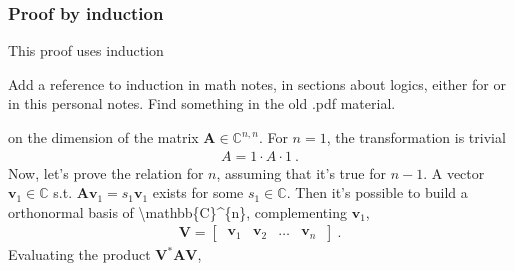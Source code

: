\documentclass[letterpaper,10pt,english]{jupyterBook}
\begin{document}
\subsubsection*{Proof by induction}

\sphinxAtStartPar
This proof uses induction%
\begin{footnote}[1]\sphinxAtStartFootnote
{} Add a reference to induction in math notes, in sections about logics, either for  or in this personal notes. Find something in the old .pdf material.
%
\end{footnote} on the dimension of the matrix \(\mathbf{A} \in \mathbb{C}^{n,n}\). For \(n = 1\), the transformation is trivial
\begin{equation*}
\begin{split}A = 1 \cdot A \cdot 1 \ .\end{split}
\end{equation*}
\sphinxAtStartPar
Now, let’s prove the relation for \(n\), assuming that it’s true for \(n-1\). A vector \(\mathbf{v}_1 \in \mathbb{C}\) s.t. \(\mathbf{A} \mathbf{v}_1 = s_1 \mathbf{v}_1\) exists for some \(s_1 \in \mathbb{C}\). Then it’s possible to build a orthonormal basis of \textbackslash{}mathbb\{C\}\textasciicircum{}\{n\}, complementing \(\mathbf{v}_1\),
\begin{equation*}
\begin{split}\mathbf{V} = \begin{bmatrix} \ \mathbf{v}_1 & \mathbf{v}_2 & \dots & \mathbf{v}_n \ \end{bmatrix} \ .\end{split}
\end{equation*}
\sphinxAtStartPar
Evaluating the product \(\mathbf{V}^* \mathbf{A} \mathbf{V}\),
\end{document}
